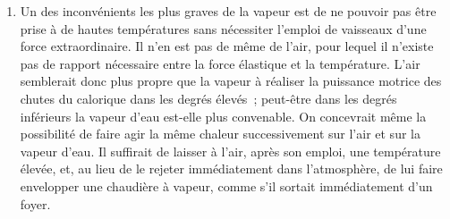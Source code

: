 \documentclass[french,twoside]{book} %
\begin{document}
\begin{enumerate}[itemsep=0pt,topsep=0pt,partopsep=0pt,parskip=0pt]
\item Un des inconvénients les plus graves de la vapeur est de ne pouvoir pas être prise à de hautes températures sans nécessiter l’emploi de vaisseaux d’une force extraordinaire. Il n’en est pas de même de l’air, pour lequel il n’existe pas de rapport nécessaire entre la force élastique et la température. L’air semblerait donc plus propre que la vapeur à réaliser la puissance motrice des chutes du calorique dans les degrés élevés ; peut-être dans les degrés inférieurs la vapeur d’eau est-elle plus convenable. On concevrait même la possibilité de faire agir la même chaleur successivement sur l’air et sur la vapeur d’eau. Il suffirait de laisser à l’air, après son emploi, une température élevée, et, au lieu de le rejeter immédiatement dans l’atmosphère, de lui faire envelopper une chaudière à vapeur, comme s’il sortait immédiatement d’un foyer.
\end{enumerate}
\end{document}

